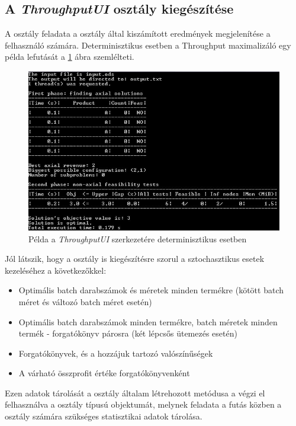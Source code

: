 \subsection{A \textit{ThroughputUI} osztály kiegészítése}
A  osztály feladata a  osztály által kiszámított eredmények megjelenítése a felhasználó számára.
Determinisztikus esetben a Throughput maximalizáló egy példa lefutását a \ref{ThroughputUI} ábra szemlélteti.
\begin{figure}[H]
\begin{center}
\includegraphics[scale=0.8]{throughputUI}
\caption{Példa a \textit{ThroughputUI} szerkezetére determinisztikus esetben}
\label{ThroughputUI}
\end{center}
\end{figure}
Jól látszik, hogy a  osztály is kiegészítésre szorul a sztochasztikus esetek kezeléséhez a következőkkel:
\begin{itemize}
\item Optimális batch darabszámok és méretek minden termékre (kötött batch méret és változó batch méret esetén)
\item Optimális batch darabszámok minden termékre, batch méretek minden termék - forgatókönyv párosra (két lépcsős ütemezés esetén)
\item Forgatókönyvek, és a hozzájuk tartozó valószínűségek
\item A várható összprofit értéke forgatókönyvenként
\end{itemize}
Ezen adatok tárolását a  osztály általam létrehozott metódusa a  végzi el felhasználva a  osztály  típusú objektumát, melynek feladata a futás közben a  osztály számára szükséges statisztikai adatok tárolása.
